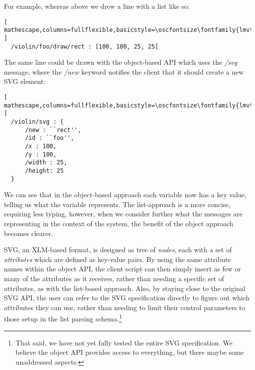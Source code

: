 
For example, whereas above we drew a line with a list like so:
\begin{lstlisting}[ mathescape,columns=fullflexible,basicstyle=\oscfontsize\fontfamily{lmvtt}\selectfont ]
  /violin/foo/draw/rect : [100, 100, 25, 25]
\end{lstlisting}

\noindent
The same line could be drawn with the object-based API which uses the \textit{/svg} message, where the \textit{/new} keyword notifies the client that it should create a new SVG element:

\begin{minipage}{\linewidth}
\begin{lstlisting}[ mathescape,columns=fullflexible,basicstyle=\oscfontsize\fontfamily{lmvtt}\selectfont ]
  /violin/svg : {
      /new : ``rect'',
      /id : ``foo'',
      /x : 100,
      /y : 100,
      /width : 25,
      /height: 25
  }
\end{lstlisting}
\end{minipage}

\noindent
We can see that in the object-based approach each variable now has a key value, telling us what the variable represents.
The list-approach is a more concise, requiring less typing, however, when we consider further what the messages are representing in the context of the \drawsocket system, the benefit of the object approach becomes clearer.

SVG, an XLM-based format, is designed as tree of \textit{nodes}, each with a set of \textit{attributes} which are defined as key-value pairs.
By using the same attribute names within the \drawsocket object API, the client script can then simply insert as few or many of the attributes as it receives, rather than needing a specific set of attributes, as with the list-based approach.
Also, by staying close to the original SVG API, the user can refer to the SVG specification directly to figure out which attributes they can use, rather than needing to limit their control parameters to those setup in the list parsing schema.\footnote{That said, we have not yet fully tested the entire SVG specification. We believe the object API provides access to everything, but there maybe some unaddressed aspects.} 


